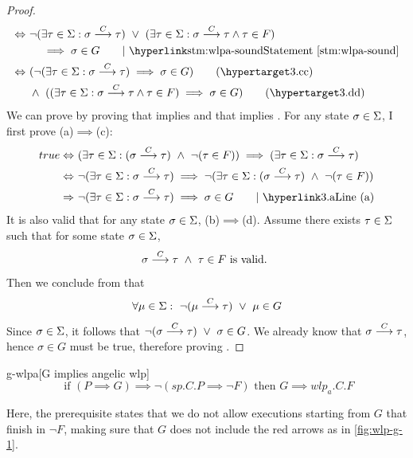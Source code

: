 \begin{proof}
\begin{align*}
	\Leftrightarrow&\  \neg(\exists \tau\in\S: \sigma\goto{C}\tau) \ \vee\ 
	(\exists \tau\in\S: \sigma\goto{C}\tau\wedge  \tau\in F)\\
	&\ \ \ \ \implies \sigma\in G \tag*{$\mid$ \stm{wlpa-sound}}\\
	\Leftrightarrow&\  (\neg(\exists \tau\in\S: \sigma\goto{C}\tau)\implies \sigma\in G ) \tag{\lblth{c}}\\
	&\ \wedge\ ((\exists \tau\in\S: \sigma\goto{C}\tau\wedge  \tau\in F)\implies\sigma\in G) \tag{\lblth{d}}\\
\end{align*}
We can prove  by proving that  implies  and that  implies .
For any state $\sigma\in\S$, I first prove (a)$\implies$(c):
\begin{align*}
	true 
	\Leftrightarrow&\ (\exists\tau\in\S:(\sigma\goto{C}\tau)\ \wedge\ \neg(\tau\in F)) \implies (\exists\tau\in\S:\sigma\goto{C}\tau)\\ 
	\Leftrightarrow&\ \neg(\exists\tau\in\S:\sigma\goto{C}\tau) \implies \neg(\exists\tau\in\S:(\sigma\goto{C}\tau)\ \wedge\ \neg(\tau\in F))  \\ 
	\Rightarrow&\ \neg(\exists\tau\in\S:\sigma\goto{C}\tau) \implies \sigma\in G \tag*{$\mid$ \refth{a}}\\
\end{align*}
It is also valid that for any state $\sigma\in\S$, (b)$\implies$(d). 
Assume there exists $\tau\in\S$ such that for some state $\sigma\in\S$, 
$$\sigma\goto{C}\tau\ \wedge\  \tau\in F \text{ is valid. }$$
Then we conclude from  that 
$$\forall \mu\in\S:\ \neg (\mu\goto{C}\tau)\ \vee\ \mu\in G$$
Since $\sigma\in\S$, it follows that $\neg(\sigma\goto{C}\tau)\ \vee\ \sigma\in G$. 
We already know that $\sigma\goto{C}\tau$, hence $\sigma\in G$ must be true, therefore proving . 
\end{proof}


\begin{lemma}{g-wlpa}[G implies angelic wlp]
\ \\ \vspace{-3mm}
	\[%
	\text{ if \ \ \ \ } 
	(P{\implies} G) \implies \neg(sp.C.P {\implies} \neg F)
	\text{\ \ \ \  then\ \ \ \  } 
	G {\implies} wlp_a.C.F
	\] 
\end{lemma}
Here, the prerequisite states that we do not allow executions starting from $G$ that  finish in $\neg F$, making sure that $G$ does not include the red arrows as in \autoref{fig:wlp-g-1}.  

